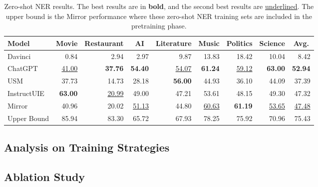 \begin{table*}[t]
    \centering
    \begin{tabular}{lrrrrrrrr}
        \toprule
    Model &
      \multicolumn{1}{c}{Movie} &
      \multicolumn{1}{c}{Restaurant} &
      \multicolumn{1}{c}{AI} &
      \multicolumn{1}{c}{Literature} &
      \multicolumn{1}{c}{Music} &
      \multicolumn{1}{c}{Politics} &
      \multicolumn{1}{c}{Science} &
      \multicolumn{1}{c}{Avg.} \\
      \midrule
    Davinci          & 0.84           & 2.94           & 2.97           & 9.87           & 13.83          & 18.42          & 10.04          & 8.42           \\
    ChatGPT          & \underline{ 41.00}    & \textbf{37.76} & \textbf{54.40} & \underline{ 54.07}    & \textbf{61.24} & \underline{ 59.12}    & \textbf{63.00} & \textbf{52.94} \\
    USM              & 37.73          & 14.73          & 28.18          & \textbf{56.00} & 44.93          & 36.10          & 44.09          & 37.39          \\
    InstructUIE      & \textbf{63.00} & \underline{ 20.99}    & 49.00          & 47.21          & 53.61          & 48.15          & 49.30          & 47.32          \\
    Mirror & 40.96          & 20.02          & \underline{ 51.13}    & 44.80          & \underline{ 60.63}    & \textbf{61.19} & \underline{ 53.65}    & \underline{ 47.48}    \\
    \midrule
    Upper Bound      & 85.94          & 83.30          & 65.72          & 67.93          & 78.25          & 75.92          & 70.96          & 75.43 \\
    \bottomrule
    \end{tabular}%
    \caption{
        Zero-shot NER results.
        The best results are in \textbf{bold}, and the second best results are \underline{underlined}.
        The upper bound is the Mirror performance where these zero-shot NER training sets are included in the pretraining phase.
    }
    \label{tab:zero_shot_ner}
\end{table*}


\subsection{Analysis on Training Strategies}


\subsection{Ablation Study}



